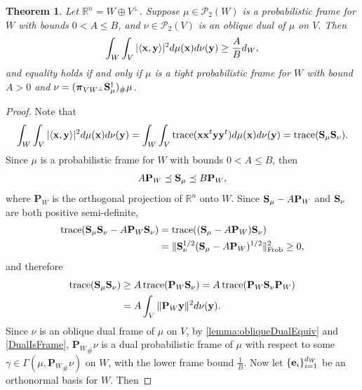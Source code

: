 \documentclass{amsart}
\numberwithin{equation}{section}
\DeclareMathOperator{\trace}{trace}
\newcommand{\bP}{{\mathbf P}}
\newcommand{\bpi}{{\boldsymbol{\pi}}}
\theoremstyle{plain}
\newtheorem{theorem}{Theorem}[section]
\theoremstyle{remark}
\theoremstyle{definition}
\begin{document}
\begin{theorem}\label{dualframepotenial2}
Let $\mathbb{R}^n = W \oplus V^\perp$. Suppose $\mu \in \mathcal{P}_2(W)$ is a probabilistic frame for $W$ with bounds $0<A \leq B$, and  $\nu \in \mathcal{P}_2(V)$ is an oblique dual of $\mu$ on $V$. Then
\begin{equation*}
    \int_{W}  \int_{V} |\langle {\bf x}, {\bf y} \rangle |^2 d\mu({\bf x}) d\nu({\bf y}) \geq \frac{A}{B}d_W,
\end{equation*}
and equality holds if and only if $\mu$ is a tight probabilistic frame for $W$ with bound $A>0$ and $\nu = ({\bpi_{VW^\perp}{\bf S}^{\dagger}_\mu})_\# \mu$. 
\end{theorem}
\begin{proof}
Note that
\begin{equation*}
    \begin{split}
       \int_{W}  \int_{V} |\langle {\bf x}, {\bf y} \rangle |^2 d\mu({\bf x}) d\nu({\bf y}) = \int_{W}  \int_{V} \trace({\bf x} {\bf x}^t {\bf y} {\bf y}^t)d\mu({\bf x}) d\nu({\bf y}) =\trace({\bf S}_\mu{\bf S}_\nu).
    \end{split}
\end{equation*}
Since $\mu$ is a probabilistic frame for $W$ with bounds $0<A \leq B$, then 
\begin{equation*}
    A \bP_W \preceq {\bf S}_\mu \preceq B \bP_W,
\end{equation*}
where $\bP_W$ is the orthogonal projection of $\mathbb{R}^n$ onto $W$. 
Since ${\bf S}_\mu - A\bP_W$ and ${\bf S}_\nu$ are both positive semi-definite,
\begin{align}
    \trace({\bf S}_\mu {\bf S}_\nu - A \bP_W {\bf S}_\nu) &= \trace(({\bf S}_\mu - A\bP_W){\bf S}_\nu)\nonumber\\ 
    &= \|{\bf S}_\nu^{1/2} ({\bf S}_\mu - A\bP_W)^{1/2}\|^2_{\text{Frob}} \geq 0,\label{eq:trace inequality}
\end{align}
and therefore
\begin{align} 
        \trace({\bf S}_\mu{\bf S}_\nu) &\geq A \trace(\bP_W{\bf S}_\nu) = A \trace(\bP_W{\bf S}_\nu \bP_W)\label{eqn:S_mu_Trace}\\
        &= A \int_{V} \|\bP_W {\bf y}\|^2 d\nu({\bf y}).\nonumber
\end{align}
 Since $\nu$ is an oblique dual frame of $\mu$ on $V$, by \cref{lemma:obliqueDualEquiv} and  \cref{DualIsFrame}, ${\bP_W}_\#\nu$ is a dual probabilistic frame of $\mu$ with respect to some $\gamma \in \Gamma(\mu, {\bP_W}_\#\nu)$ on $W$, with the lower frame bound $\frac{1}{B}$. Now let $\{{\bf e}_i\}_{i=1}^{d_W}$ be an orthonormal basis for $W$. Then

\end{proof}
\end{document}
